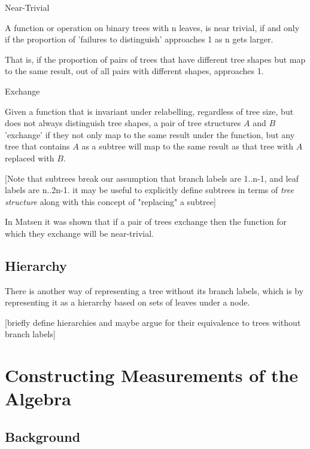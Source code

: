 \documentclass{report}
\begin{document}
\begin{definition} Near-Trivial

	A function or operation on binary trees with n leaves, is near trivial, if and only if the proportion of 'failures to distinguish' approaches 1 as n gets larger.

	That is, if the proportion of pairs of trees that have different tree shapes but map to the same result, out of all pairs with different shapes, approaches 1.
\end{definition}

\begin{definition} Exchange

	Given a function that is invariant under relabelling, regardless of tree size, but does not always distinguish tree shapes, a pair of tree structures $A$ and $B$ 'exchange' if they not only map to the same result under the function, but any tree that contains $A$ as a subtree will map to the same result as that tree with $A$ replaced with $B$.
\end{definition}

[Note that subtrees break our assumption that branch labels are 1..n-1, and leaf labels are n..2n-1. it may be useful to explicitly define subtrees in terms of \emph{tree structure} along with this concept of "replacing" a subtree]

In Matsen it was shown that if a pair of trees exchange then the function for which they exchange will be near-trivial.  %

\subsection{Hierarchy}

There is another way of representing a tree without its branch labels, which is by representing it as a hierarchy based on sets of leaves under a node.

[briefly define hierarchies and maybe argue for their equivalence to trees without branch labels]

\section{Constructing Measurements of the Algebra}

\subsection{Background}
\end{document}

